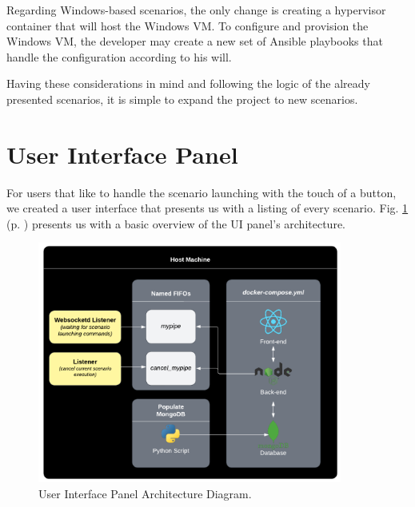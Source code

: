 Regarding Windows-based scenarios, the only change is creating a hypervisor container that will host the Windows VM. To configure and provision the Windows VM, the developer may create a new set of Ansible playbooks that handle the configuration according to his will.

Having these considerations in mind and following the logic of the already presented scenarios, it is simple to expand the project to new scenarios. 


\section{User Interface Panel} \label{sec:validation_ui}

For users that like to handle the scenario launching with the touch of a button, we created a user interface that presents us with a listing of every scenario. Fig. \ref{fig:ui_architecture_diagram} (p. \pageref{fig:ui_architecture_diagram}) presents us with a basic overview of the UI panel's architecture.

\begin{figure}[H]
    \includegraphics[width=10cm]{figures/ui_diagram.pdf}
    \caption{User Interface Panel Architecture Diagram.}
    \label{fig:ui_architecture_diagram}
\end{figure}

